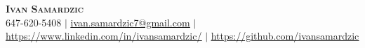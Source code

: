 \begin{center}
	\textbf{\Huge \scshape Ivan Samardzic} \\ \vspace{1pt}
	\small 647-620-5408 $|$
    \href{mailto:ivan.samardzic7@gmail.com}{\underline{ivan.samardzic7@gmail.com}} $|$
	\href{https://www.linkedin.com/in/ivansamardzic/}{\underline{https://www.linkedin.com/in/ivansamardzic/}} $|$
	\href{https://github.com/ivansamardzic}{\underline{https://github.com/ivansamardzic}}
\end{center}
